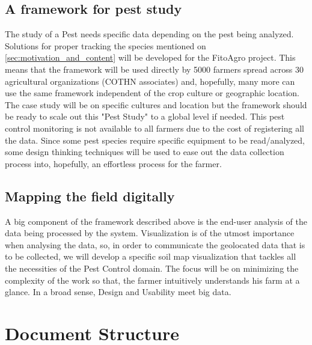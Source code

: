 \subsection{A framework for pest study}
\label{sec:pest_study_framework}

The study of a Pest needs specific data depending on the pest being analyzed. Solutions for proper tracking the species mentioned on \ref{sec:motivation_and_content} will be developed for the FitoAgro project. This means that the framework will be used directly by 5000 farmers spread across 30 agricultural organizations (COTHN associates) and, hopefully, many more can use the same framework independent of the crop culture or geographic location. The case study will be on specific cultures and location but the framework should be ready to scale out this "Pest Study" to a global level if needed. This pest control monitoring is not available to all farmers due to the cost of registering all the data. Since some pest species require specific equipment to be read/analyzed, some design thinking techniques will be used to ease out the data collection process into, hopefully, an effortless process for the farmer. 

\subsection{Mapping the field digitally}
\label{sec:mapping_the_field}

A big component of the framework described above is the end-user analysis of the data being processed by the system. Visualization is of the utmost importance when analysing the data, so, in order to communicate the geolocated data that is to be collected, we will develop a specific soil map visualization that tackles all the necessities of the Pest Control domain. The focus will be on minimizing the complexity of the work so that, the farmer intuitively understands his farm at a glance. In a broad sense, Design and Usability meet big data.






\section{Document Structure} %
\label{sec:document_structure}

